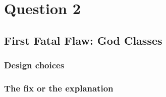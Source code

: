 \section{Question 2}
\subsection{First Fatal Flaw: God Classes}

\subsubsection{Design choices}

\subsubsection{The fix or the explanation}